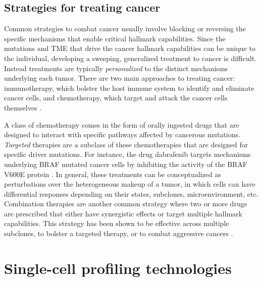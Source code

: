 
\subsection{Strategies for treating cancer}
Common strategies to combat cancer usually involve blocking or reversing the specific mechanisms that enable critical hallmark capabilities.
Since the mutations and TME that drive the cancer hallmark capabilities can be unique to the individual,
developing a sweeping, generalized treatment to cancer is difficult.
Instead treatments are typically \emph{personalized} to the distinct mechanisms underlying each tumor.
There are two main approaches to treating cancer:
immunotherapy, which bolster the host immune system to identify and eliminate cancer cells,
and chemotherapy, which target and attack the cancer cells themselves \cite{hanahan2011}.

A class of chemotherapy comes in the form of orally ingested drugs that are designed to interact with specific pathways affected by cancerous mutations.
\emph{Targeted} therapies are a subclass of these chemotherapies that are designed for specific driver mutations.
For instance, the drug dabrafenib targets mechanisms underlying BRAF mutated cancer cells by inhibiting the activity of the BRAF V600E protein \cite{khunger2018}.
In general, these treatments can be conceptualized as perturbations over the heterogeneous makeup of a tumor, in which cells can have differential responses depending on their states, subclones, microenvironment, etc.
Combination therapies are another common strategy where two or more drugs are prescribed that either have synergistic effects or target multiple hallmark capabilities.
This strategy has been shown to be effective across multiple subclones, to bolster a targeted therapy, or to combat aggressive cancers \cite{hanahan2011}.

\section{Single-cell profiling technologies}

